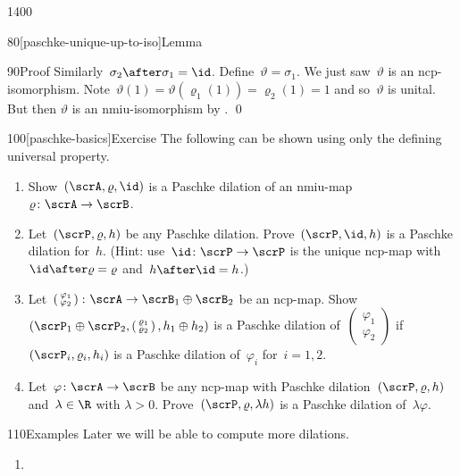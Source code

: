 \begin{parsec}{1400}
\begin{point}{80}[paschke-unique-up-to-iso]{Lemma}
\begin{point}{90}{Proof}
Similarly~$\sigma_2 \after \sigma_1 = \id$.
Define~$\vartheta = \sigma_1$.
We just saw~$\vartheta$ is an ncp-isomorphism.
Note~$\vartheta(1) = \vartheta(\varrho_1(1)) = \varrho_2(1) = 1$
and so~$\vartheta$ is unital.
But then
    $\vartheta$ is an nmiu-isomorphism
    by . \qed
\par
\end{point}
\end{point}
\spacingfix{}
\begin{point}{100}[paschke-basics]{Exercise}%
The following can be shown using only the defining universal property.
\begin{enumerate}
\item
Show~$(\scrA,\varrho,\id)$ is a Paschke dilation of
    an nmiu-map~$\varrho\colon \scrA \to \scrB$.
\item
Let~$(\scrP, \varrho, h)$ be any Paschke dilation.
Prove~$(\scrP, \id, h)$ is a Paschke dilation for~$h$.
(Hint: use~$\id\colon \scrP \to \scrP$
is the unique ncp-map with~$\id \after \varrho = \varrho$
and~$h \after \id = h$.)
\item
    Let~$ \left(\begin{smallmatrix} \varphi_1 \\ \varphi_2
    \end{smallmatrix}\right) \colon \scrA \to \scrB_1 \oplus \scrB_2$
    be an ncp-map.
Show~$(\scrP_1 \oplus \scrP_2,
        \left(\begin{smallmatrix} \varrho_1 \\ \varrho_2 \end{smallmatrix}\right),
        h_1 \oplus h_2)$
        is a Paschke dilation of~$\left(\begin{smallmatrix} \varphi_1 \\ \varphi_2 
        \end{smallmatrix}\right)$
    if~$(\scrP_i, \varrho_i, h_i)$
    is a Paschke dilation of~$\varphi_i$ for~$i=1,2$.
\item
Let~$\varphi\colon \scrA \to \scrB$
    be any ncp-map with Paschke dilation~$(\scrP, \varrho, h)$
    and~$\lambda \in \R$ with $\lambda > 0$.
Prove~$(\scrP, \varrho, \lambda h)$
    is a Paschke dilation of~$\lambda \varphi$.
\end{enumerate}
\spacingfix{}
\end{point}
\begin{point}{110}{Examples}%
Later we will be able to compute more dilations.
\begin{enumerate}
\item

\end{enumerate}
\end{point}
\end{parsec}
